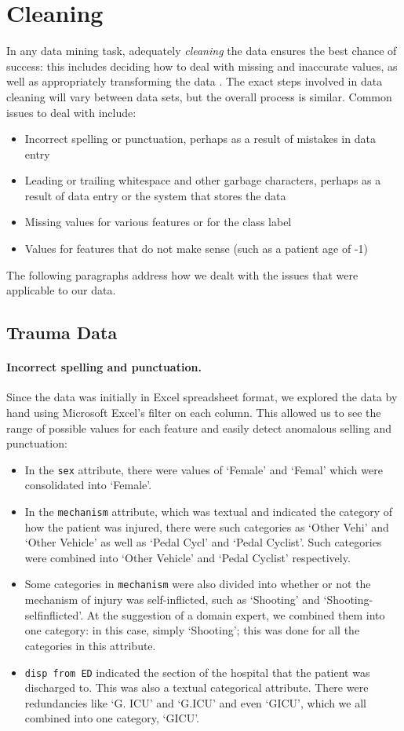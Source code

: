 \section{Cleaning} %
In any data mining task, adequately \textit{cleaning} the data ensures the best
chance of success: this includes deciding how to deal with missing and
inaccurate values, as well as appropriately transforming the data
\citep{Witten2005}.
The exact steps involved in data cleaning will vary between data
sets, but the overall process is similar. Common issues to deal with include:
\begin{itemize}
\item Incorrect spelling or punctuation, perhaps as a result of mistakes in
data entry
\item Leading or trailing whitespace and other garbage characters,
perhaps as a result of data entry or the system that stores the data
\item Missing values for various features or for the class label
\item Values for features that do not make sense (such as a patient age of
-1)
\end{itemize}
The following paragraphs address how we dealt with the issues that were
applicable to our data.

\subsection{Trauma Data}
\paragraph{Incorrect spelling and punctuation.}
Since the data was initially in Excel spreadsheet format, we explored the data
by hand using Microsoft Excel's filter on each column. This allowed us to see
the range of possible values for each feature and easily detect anomalous
selling and punctuation:
\begin{itemize}
  \item In the \texttt{sex} attribute, there were values of `Female' and
  `Femal' which were consolidated into `Female'.
  \item In the \texttt{mechanism} attribute, which was textual and indicated
  the category of how the patient was injured, there were such categories as
  `Other Vehi' and `Other Vehicle' as well as `Pedal Cycl' and `Pedal Cyclist'.
  Such categories were combined into `Other Vehicle' and `Pedal Cyclist'
  respectively.
  \item Some categories in \texttt{mechanism} were also divided into whether or
  not the mechanism of injury was self-inflicted, such as `Shooting' and
  `Shooting-selfinflicted'. At the suggestion of a domain expert, we combined
  them into one category: in this case, simply
  `Shooting'; this was done for all the categories in this attribute.
  \item \texttt{disp from ED} indicated the section of the hospital that the
  patient was discharged to. This was also a textual categorical attribute.
  There were redundancies like `G. ICU' and `G.ICU' and even `GICU', which we
  all combined into one category, `GICU'.
\end{itemize}

